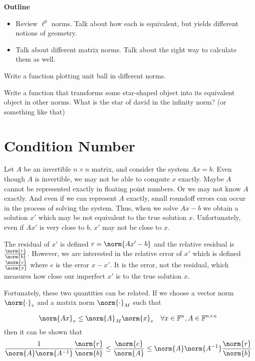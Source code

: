 
{\bf Outline}
\begin{itemize}
\item Review $\ell^p$ norms. Talk about how each is equivalent, but yields different notions of geometry.
\item Talk about different matrix norms. Talk about the right way to calculate them as well.
\end{itemize}
\begin{problem}
Write a function plotting unit ball in different norms.
\end{problem}



\begin{problem}
Write a function that transforms some star-shaped object into its equivalent object in other norms. What is the star of david in the infinity norm? (or something like that)
\end{problem}

\section*{Condition Number}

Let $A$ be an invertible $n \times n $ matrix, and consider the system $Ax = b$. Even though $A$ is invertible, we may not be able to compute $x$ exactly.  Maybe $A$ cannot be represented exactly in floating point numbers. Or we may not know $A$ exactly. And even if we can represent $A$ exactly, small roundoff errors can occur in the process of solving the system. Thus, when we solve $Ax-b$ we obtain a solution $x'$ which may be not equivalent to the true solution $x$. Unfortunately, even if $Ax'$ is very close to $b$, $x'$ may not be close to $x$. 

The residual of $x'$ is defined $r = \norm{Ax'-b}$ and the relative residual is $\frac{\norm{r}}{\norm{b}}$. However, we are interested in the relative error of $x'$ which is defined $\frac{\norm{e}}{\norm{x}}$ where $e$ is the error $x-x'$. It is the error, not the residual, which measures how close our imperfect $x'$ is to the true solution $x$. 

Fortunately, these two quantities can be related. If we choose a vector norm $\norm{\cdot} _v$ and a matrix norm $\norm{\cdot} _M$ such that 

\begin{equation} \label{eq:normcondition}
\norm{Ax}_v \leq \norm{A}_M\norm{x}_v \quad \forall x \in  \mathbb{F}^n, A \in \mathbb{F}^{n \times n}
\end{equation}
then it can be shown that 
\begin{equation*}
\frac{1}{\norm{A} \norm{A^{-1}}} \frac{\norm{r}}{\norm{b}} \leq \frac{\norm{e}}{\norm{A}} \leq \norm{A} \norm{A^{-1}} \frac{\norm{r}}{\norm{b}}
\end{equation*}


